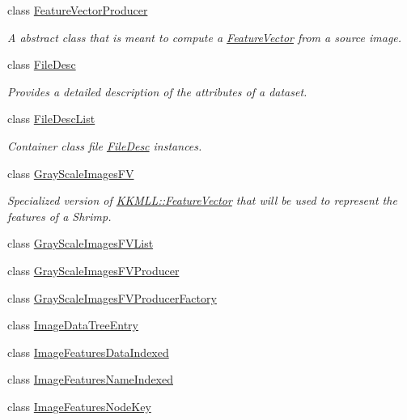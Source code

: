 \begin{DoxyCompactItemize}
class \hyperlink{class_k_k_m_l_l_1_1_feature_vector_producer}{Feature\+Vector\+Producer}
\begin{DoxyCompactList}\small\item\em A abstract class that is meant to compute a \hyperlink{class_k_k_m_l_l_1_1_feature_vector}{Feature\+Vector} from a source image. \end{DoxyCompactList}\item 
class \hyperlink{class_k_k_m_l_l_1_1_file_desc}{File\+Desc}
\begin{DoxyCompactList}\small\item\em Provides a detailed description of the attributes of a dataset. \end{DoxyCompactList}\item 
class \hyperlink{class_k_k_m_l_l_1_1_file_desc_list}{File\+Desc\+List}
\begin{DoxyCompactList}\small\item\em Container class file \textquotesingle{}\hyperlink{class_k_k_m_l_l_1_1_file_desc}{File\+Desc}\textquotesingle{} instances. \end{DoxyCompactList}\item 
class \hyperlink{class_k_k_m_l_l_1_1_gray_scale_images_f_v}{Gray\+Scale\+Images\+FV}
\begin{DoxyCompactList}\small\item\em Specialized version of \hyperlink{class_k_k_m_l_l_1_1_feature_vector}{K\+K\+M\+L\+L\+::\+Feature\+Vector} that will be used to represent the features of a Shrimp. \end{DoxyCompactList}\item 
class \hyperlink{class_k_k_m_l_l_1_1_gray_scale_images_f_v_list}{Gray\+Scale\+Images\+F\+V\+List}
\item 
class \hyperlink{class_k_k_m_l_l_1_1_gray_scale_images_f_v_producer}{Gray\+Scale\+Images\+F\+V\+Producer}
\item 
class \hyperlink{class_k_k_m_l_l_1_1_gray_scale_images_f_v_producer_factory}{Gray\+Scale\+Images\+F\+V\+Producer\+Factory}
\item 
class \hyperlink{class_k_k_m_l_l_1_1_image_data_tree_entry}{Image\+Data\+Tree\+Entry}
\item 
class \hyperlink{class_k_k_m_l_l_1_1_image_features_data_indexed}{Image\+Features\+Data\+Indexed}
\item 
class \hyperlink{class_k_k_m_l_l_1_1_image_features_name_indexed}{Image\+Features\+Name\+Indexed}
\item 
class \hyperlink{class_k_k_m_l_l_1_1_image_features_node_key}{Image\+Features\+Node\+Key}

\end{DoxyCompactItemize}
